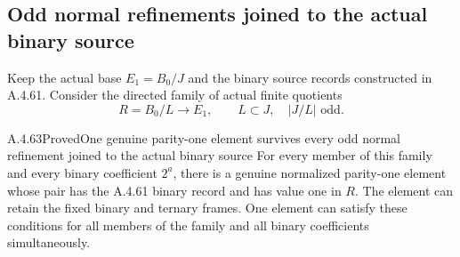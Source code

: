 \subsection{Odd normal refinements joined to the actual binary source}

Keep the actual base $E_1=B_0/J$ and the binary source records
constructed in A.4.61. Consider the directed family of actual finite
quotients
\[
             R=B_0/L\longrightarrow E_1,
             \qquad L\subset J,\quad |J/L|\text{ odd}.
                                                        \tag{OJB.1}
\]
\begin{result}{A.4.63}{Proved}{One genuine parity-one element survives every odd normal refinement joined to the actual binary source}
\label{thm:ghost-odd-kernel-binary-join}
For every member of this family and every binary coefficient
$2^a$, there is a genuine normalized parity-one element whose
pair has the A.4.61 binary record and has value one in $R$.
The element can retain the fixed binary and ternary frames.
One element can satisfy these conditions for all members of
the family and all binary coefficients simultaneously.
\end{result}

